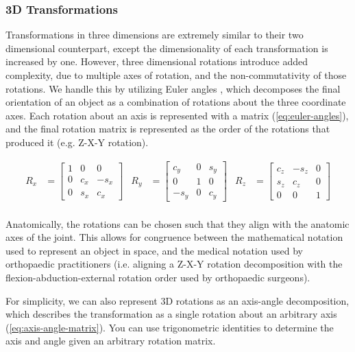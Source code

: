 \subsubsection{3D Transformations}
\label{sec:3d-transformations}
Transformations in three dimensions are extremely similar to their two dimensional counterpart, except the dimensionality of each transformation is increased by one. However, three dimensional rotations introduce added complexity, due to multiple axes of rotation, and the non-commutativity of those rotations. We handle this by utilizing Euler angles \cite{groodJointCoordinateSystem1983}, which decomposes the final orientation of an object as a combination of rotations about the three coordinate axes. Each rotation about an axis is represented with a matrix (\cref{eq:euler-angles}), and the final rotation matrix is represented as the order of the rotations that produced it (e.g. Z-X-Y rotation).

\begin{equation}
    \begin{aligned}
        R_{x} &= \begin{bmatrix}
            1 & 0 & 0 \\ 0 & c_x & -s_x \\ 0 & s_x & c_x
        \end{bmatrix}
        &R_{y} &= \begin{bmatrix}
            c_y & 0 & s_y \\ 0 & 1 & 0 \\ -s_y & 0 & c_y
        \end{bmatrix}
        &R_{z} &= \begin{bmatrix}
            c_z & -s_z & 0 \\ s_z & c_z & 0 \\ 0 & 0 & 1
        \end{bmatrix} \\
    \end{aligned}
    \label{eq:euler-angles}
\end{equation}

Anatomically, the rotations can be chosen such that they align with the anatomic axes of the joint. This allows for congruence between the mathematical notation used to represent an object in space, and the medical notation used by orthopaedic practitioners (i.e. aligning a Z-X-Y rotation decomposition with the flexion-abduction-external rotation order used by orthopaedic surgeons).

For simplicity, we can also represent 3D rotations as an axis-angle decomposition, which describes the transformation as a single rotation about an arbitrary axis \cite{craneKinematicAnalysisRobot2008} (\cref{eq:axis-angle-matrix}). You can use trigonometric identities to determine the axis and angle given an arbitrary rotation matrix.

